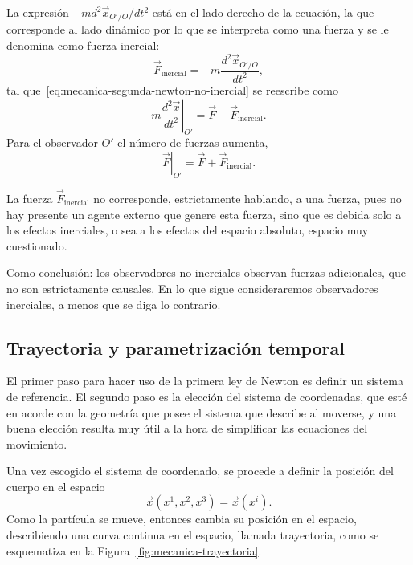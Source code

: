 \documentclass[../apunte_mecanica_clasica.tex]{subfiles}%
\begin{document}
La expresión $-m d^2\vec x_{O'/O}/dt^2$ está en el lado derecho de la ecuación, la que corresponde al lado dinámico por lo que se interpreta como una fuerza y se le denomina como fuerza inercial:
\begin{equation}
    \vec F_{\text{inercial}}=-m\frac{d^2\vec x_{O'/O}}{dt^2},
    \label{eq:mecanica-fuerza-inercial}
\end{equation}
tal que~\eqref{eq:mecanica-segunda-newton-no-inercial} se reescribe como
\begin{equation}
    m\left.\frac{d^2\vec x}{dt^2}\right|_{O'}=\vec F+\vec F_{\text{inercial}}.
    \label{eq:mecanica-segunda-newton-con-fuerza-inercial}
\end{equation}
Para el observador $O'$ el número de fuerzas aumenta,
\begin{equation}
    \left.\vec F\right|_{O'}=\vec F+\vec F_{\text{inercial}}.
    \label{eq:mecanica-fuerza-total-no-inercial}
\end{equation}

La fuerza $\vec F_{\text{inercial}}$ no corresponde, estrictamente hablando, a una fuerza, pues no hay presente un agente externo que genere esta fuerza, sino que es debida solo a los efectos inerciales, o sea a los efectos del espacio absoluto, espacio muy cuestionado.

Como conclusión: los observadores no inerciales observan fuerzas adicionales, que no son estrictamente causales. En lo que sigue consideraremos observadores inerciales, a menos que se diga lo contrario.

\subsection{Trayectoria y parametrización temporal}

El primer paso para hacer uso de la primera ley de Newton es definir un sistema de referencia. El segundo paso es la elección del sistema de coordenadas, que esté en acorde con la geometría que posee el sistema que describe al moverse, y una buena elección resulta muy útil a la hora de simplificar las ecuaciones del movimiento.

Una vez escogido el sistema de coordenado, se procede a definir la posición del cuerpo en el espacio
\begin{equation*}
    \vec x(x^1,x^2,x^3)=\vec x(x^i).
\end{equation*}
Como la partícula se mueve, entonces cambia su posición en el espacio, describiendo una curva continua en el espacio, llamada trayectoria, como se esquematiza en la Figura~\ref{fig:mecanica-trayectoria}.
\end{document}
